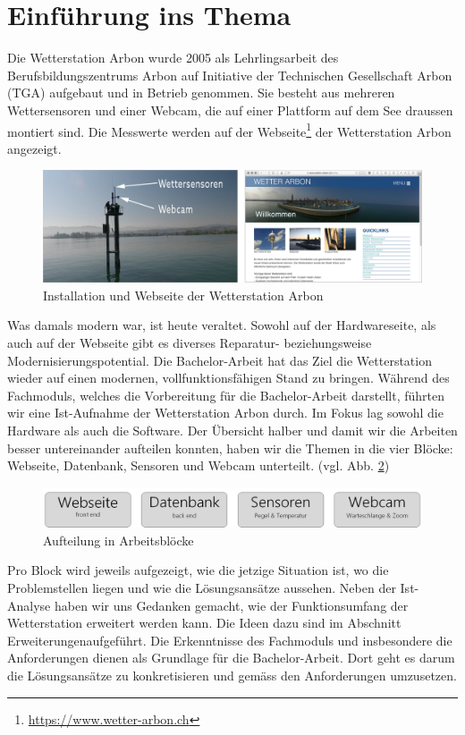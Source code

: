 \section*{Einführung ins Thema}

Die Wetterstation Arbon wurde 2005 als Lehrlingsarbeit des Berufsbildungszentrums Arbon auf Initiative der Technischen Gesellschaft Arbon (TGA) aufgebaut und in Betrieb genommen. Sie besteht aus mehreren Wettersensoren und einer Webcam, die auf einer Plattform auf dem See draussen montiert sind. Die Messwerte werden auf der Webseite\footnote{ \url{https://www.wetter-arbon.ch}}  der Wetterstation Arbon angezeigt.

\begin{figure}[h!]
	\centering
	\includegraphics[width=1\linewidth]{img/kombi}
	\caption{Installation und Webseite der Wetterstation Arbon}
	\label{img:wetterstation}
\end{figure}

Was damals modern war, ist heute veraltet. Sowohl auf der Hardwareseite, als auch auf der Webseite gibt es diverses Reparatur- beziehungsweise Modernisierungspotential. Die Bachelor-Arbeit hat das Ziel die Wetterstation wieder auf einen modernen, vollfunktionsfähigen Stand zu bringen. Während des Fachmoduls, welches die Vorbereitung für die Bachelor-Arbeit darstellt, führten wir eine Ist-Aufnahme der Wetterstation Arbon durch. Im Fokus lag sowohl die Hardware als auch die Software. Der Übersicht halber und damit wir die Arbeiten besser untereinander aufteilen konnten, haben wir die Themen in die vier Blöcke:  Webseite, Datenbank, Sensoren und Webcam unterteilt. (vgl. Abb. \ref{img:module})

\vspace{5mm} %

\begin{figure}[h!]
	\centering
	\includegraphics[width=0.8\linewidth]{img/module}
	\caption{Aufteilung in Arbeitsblöcke}
	\label{img:module}
\end{figure}

Pro Block wird jeweils aufgezeigt, wie die jetzige Situation ist, wo die Problemstellen liegen und wie die Lösungsansätze aussehen. Neben der Ist-Analyse haben wir uns Gedanken gemacht, wie der Funktionsumfang der Wetterstation erweitert werden kann. Die Ideen dazu sind im Abschnitt \flqq Erweiterungen\frqq aufgeführt. Die Erkenntnisse des Fachmoduls und insbesondere die Anforderungen dienen als Grundlage für die Bachelor-Arbeit. Dort geht es darum die Lösungsansätze zu konkretisieren und gemäss den Anforderungen umzusetzen.

\newpage
